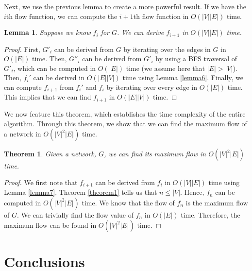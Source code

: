 \documentclass{report}
\newtheorem{lemma}{Lemma}[section]
\newtheorem{theorem}{Theorem}[section]
\begin{document}
Next, we use the previous lemma to create a more powerful result. If we have the $i$th flow function, we can compute the $i+1$th flow function in $O(|V||E|)$ time.
\begin{lemma}
    Suppose we know $f_i$ for $G$. We can derive $f_{i+1}$ in $O(|V||E|)$ time.
\end{lemma}
\begin{proof}
    First, $G'_i$ can be derived from $G$ by iterating over the edges in $G$ in $O(|E|)$ time. Then, $G''_i$ can be derived from $G'_i$ by using a BFS traversal of $G'_i$, which can be computed in $O(|E|)$ time (we assume here that $|E| > |V|$). Then, $f_i'$ can be derived in $O(|E||V|)$ time using Lemma \ref{lemma6}. Finally, we can compute $f_{i+1}$ from $f_i'$ and $f_i$ by iterating over every edge in $O(|E|)$ time. This implies that we can find $f_{i+1}$ in $O(|E||V|)$ time.
\end{proof}

We now feature this theorem, which establishes the time complexity of the entire algorithm. Through this theorem, we show that we can find the maximum flow of a network in $O(|V|^2|E|)$ time.
\begin{theorem}
    Given a network, $G$, we can find its maximum flow in $O(|V|^2|E|)$ time.
\end{theorem}
\begin{proof}
    We first note that $f_{i+1}$ can be derived from $f_i$ in $O(|V||E|)$ time using Lemma \ref{lemma7}. Theorem \ref{theorem1} tells us that $n \le |V|$. Hence, $f_n$ can be computed in $O(|V|^2|E|)$ time. We know that the flow of $f_n$ is the maximum flow of $G$. We can trivially find the flow value of $f_n$ in $O(|E|)$ time. Therefore, the maximum flow can be found in $O(|V|^2|E|)$ time.
\end{proof}

\chapter{Conclusions}
\end{document}
